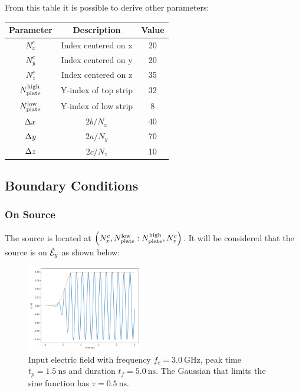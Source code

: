 From this table it is possible to derive other parameters:

\begin{table}[H]
    \centering
    \begin{tabular}{|c|c|c|}
    \hline
    \textbf{Parameter}                           & \textbf{Description} & \textbf{Value} \\ \hline
    $N_x^c$                                      & Index centered on x  & 20             \\ \hline
    $N_y^c$                                      & Index centered on y  & 20             \\ \hline
    $N_z^c$                                      & Index centered on z  & 35             \\ \hline
    $N_{\textnormal{plate}}^{\textnormal{high}}$ & Y-index of top strip & 32             \\ \hline
    $N_{\textnormal{plate}}^{\textnormal{low}}$  & Y-index of low strip & 8              \\ \hline
    $\Delta x$                                        & ${2b}/{N_x}$         & 40             \\ \hline
    $\Delta y$                                        & ${2a}/{N_y}$         & 70             \\ \hline
    $\Delta z$                                        & ${2c}/{N_z}$         & 10             \\ \hline
    \end{tabular}
\end{table}

\subsection{Boundary Conditions}

\subsubsection{On Source} \hfill

The source is located at $\pare{N_x^c, N_{\textnormal{plate}}^{\textnormal{low}} : N_{\textnormal{plate}}^{\textnormal{high}}, N_z^c}$. It will be considered that the source is on $\tilde{\mathcal{E}}_y$ as shown below: 

\begin{figure}[H]
    \centering
    \includegraphics[width=0.45\textwidth]{contents/input_source.png}
    \caption{Input electric field with frequency $f_c = \SI{3.0}{\giga\hertz}$, peak time $t_p = \SI{1.5}{\nano\second}$ and duration $t_f = \SI{5.0}{\nano\second}$. The Gaussian that limits the sine function has $\tau = \SI{0.5}{\nano\second}$.}
\end{figure}

